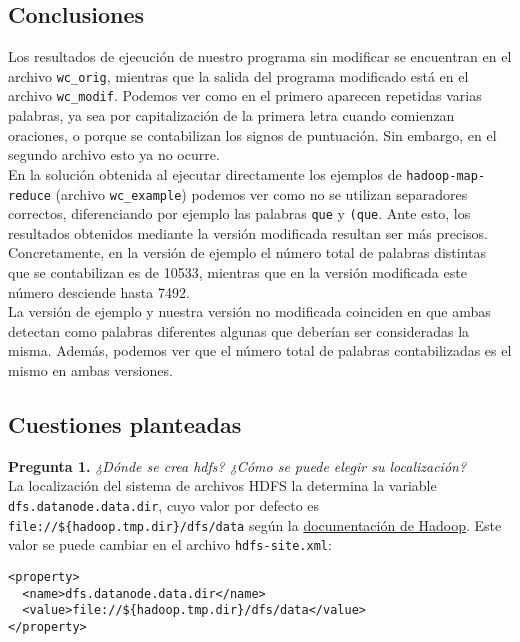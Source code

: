 \documentclass[11pt]{article}
\begin{document}
\subsection{Conclusiones}

Los resultados de ejecución de nuestro programa sin modificar se encuentran en el archivo \verb|wc_orig|, mientras que la salida del programa modificado está en el archivo \verb|wc_modif|. Podemos ver como en el primero aparecen repetidas varias palabras, ya sea por capitalización de la primera letra cuando comienzan oraciones, o porque se contabilizan los signos de puntuación. Sin embargo, en el segundo archivo esto ya no ocurre.\\

En la solución obtenida al ejecutar directamente los ejemplos de \verb|hadoop-map-reduce| (archivo \texttt{wc\_example}) podemos ver como no se utilizan separadores correctos, diferenciando por ejemplo las palabras \texttt{que} y \texttt{(que}. Ante esto, los resultados obtenidos mediante la versión modificada resultan ser más precisos. Concretamente, en la versión de ejemplo el número total de palabras distintas que se contabilizan es de 10533, mientras que en la versión modificada este número desciende hasta 7492.\\

La versión de ejemplo y nuestra versión no modificada coinciden en que ambas detectan como palabras diferentes algunas que deberían ser consideradas la misma. Además, podemos ver que el número total de palabras contabilizadas es el mismo en ambas versiones.

\subsection{Cuestiones planteadas}

\textbf{Pregunta 1. }\textit{¿Dónde se crea hdfs? ¿Cómo se puede elegir su localización?}\\

La localización del sistema de archivos HDFS la determina la variable \texttt{dfs.datanode.data.dir}, cuyo valor por defecto es \verb|file://${hadoop.tmp.dir}/dfs/data| según la \href{https://hadoop.apache.org/docs/r2.4.1/hadoop-project-dist/hadoop-hdfs/hdfs-default.xml}{documentación de Hadoop}. Este valor se puede cambiar en el archivo \texttt{hdfs-site.xml}:

\begin{verbatim}
<property>
  <name>dfs.datanode.data.dir</name>
  <value>file://${hadoop.tmp.dir}/dfs/data</value>
</property>
\end{verbatim}
\end{document}
